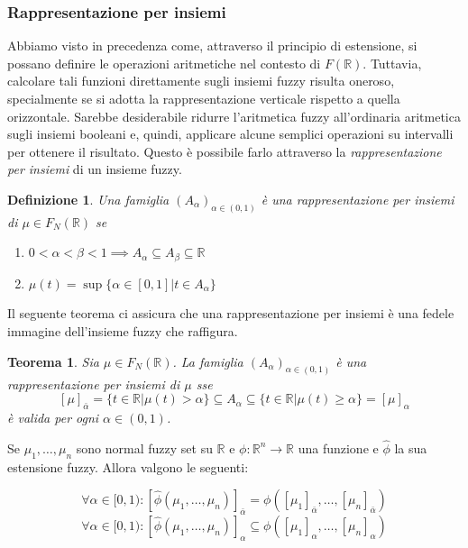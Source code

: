 \documentclass[10pt,a4paper]{article}
\newtheorem{definition}{Definizione}
\newtheorem{theorem}{Teorema}
\begin{document}
\subsubsection{Rappresentazione per insiemi}

Abbiamo visto in precedenza come, attraverso il principio di estensione, si possano definire le operazioni aritmetiche nel contesto di $F(\mathbb{R})$. Tuttavia, calcolare tali funzioni direttamente sugli insiemi fuzzy risulta oneroso, specialmente se si adotta la rappresentazione verticale rispetto a quella orizzontale. Sarebbe desiderabile ridurre l'aritmetica fuzzy all'ordinaria aritmetica sugli insiemi booleani e, quindi, applicare alcune semplici operazioni su intervalli per ottenere il risultato. Questo è possibile farlo attraverso la \emph{rappresentazione per insiemi} di un insieme fuzzy.

\newpage

\begin{definition}
Una famiglia $(A_\alpha)_{\alpha \in (0,1)}$ è una \emph{rappresentazione per insiemi} di $\mu \in F_N(\mathbb{R})$ se
\begin{enumerate}
\item{$0 < \alpha < \beta < 1 \implies A_\alpha \subseteq A_\beta \subseteq \mathbb{R}$}
\item{$\mu(t) = \sup \{ \alpha \in [0,1] | t \in A_\alpha \} $}
\end{enumerate} 
\end{definition}

Il seguente teorema ci assicura che una rappresentazione per insiemi è una fedele immagine dell'insieme fuzzy che raffigura.

\begin{theorem}
Sia $\mu \in F_N(\mathbb{R})$. La famiglia $(A_\alpha)_{\alpha \in (0,1)}$ è una rappresentazione per insiemi di $\mu$ sse 
$$
[\mu]_{\bar{\alpha}} = \{ t \in \mathbb{R} | \mu(t) > \alpha \} \subseteq A_\alpha \subseteq \{ t \in \mathbb{R} | \mu(t) \geq \alpha \} = [\mu]_\alpha
$$
è valida per ogni $\alpha \in (0,1)$.
\end{theorem}

Se $\mu_1, \dots, \mu_n$ sono normal fuzzy set su $\mathbb{R}$ e $\phi: \mathbb{R}^n \to \mathbb{R}$ una funzione e $\hat{\phi}$ la sua estensione fuzzy. Allora valgono le seguenti:

$$
\forall \alpha \in [0,1) : [\hat{\phi}(\mu_1,\dots,\mu_n)]_{\bar{\alpha}} = \phi([\mu_1]_{\bar{\alpha}}, \dots, [\mu_n]_{\bar{\alpha}})
$$
$$
\forall \alpha \in [0,1) : [\hat{\phi}(\mu_1,\dots,\mu_n)]_\alpha \subseteq \phi([\mu_1]_\alpha, \dots, [\mu_n]_\alpha)
$$
\end{document}
